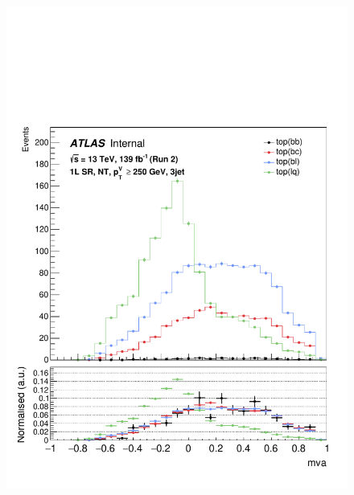 \begin{figure}[h!]
\includegraphics[scale=0.253]{Images/VH/top/OneLepton_top_1nttag3jet_SR_250ptv_mva.pdf}

\end{figure}
